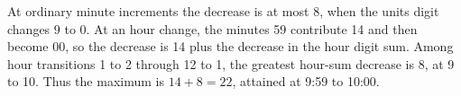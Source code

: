 At ordinary minute increments the decrease is at most 8, when the units digit changes 9 to 0. At an hour change, the minutes 59 contribute 14 and then become 00, so the decrease is 14 plus the decrease in the hour digit sum. Among hour transitions 1 to 2 through 12 to 1, the greatest hour-sum decrease is 8, at 9 to 10. Thus the maximum is $ 14+8=\boxed{22}$, attained at 9:59 to 10:00.
